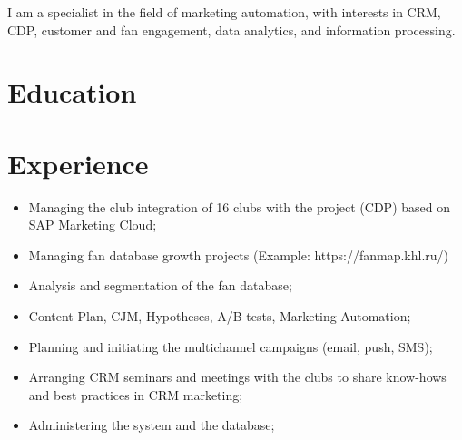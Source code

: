 \documentclass[11pt,a4paper,sans]{moderncv}
\begin{document}
 

\makecvtitle

I am a specialist in the field of marketing automation, with interests in CRM, CDP, customer and fan engagement, data analytics, and information processing.

\section{Education}


\section{Experience}


\begin{itemize}
\item Managing the club integration of 16 clubs with the project (CDP) based on SAP Marketing
Cloud;
\item Managing fan database growth projects (Example: https://fanmap.khl.ru/)
\item Analysis and segmentation of the fan database;
\item Content Plan, CJM, Hypotheses, A/B tests, Marketing Automation;
\item Planning and initiating the multichannel campaigns (email, push, SMS);
\item Arranging CRM seminars and meetings with the clubs to share know-hows and best practices in CRM marketing;
\item Administering the system and the database;\newline{}
\end{itemize}

\end{document}
